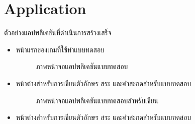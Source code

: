 \documentclass[12pt,oneside,openright,a4paper]{cpe-thai-project}
\begin{document}
\section{Application}
ตัวอย่างแอปพลิเคชันที่ดำเนินการสร้างเสร็จ
\begin{itemize}
  \item  หน้าแรกของเกมที่ใช้ทำแบบทดสอบ  
  \begin{figure}[!h]\centering
    \setlength{\fboxrule}{0.2mm} %
    \setlength{\fboxsep}{1cm}
    \caption{ภาพหน้าจอแอปพลิเคชันแบบทดสอบ}\label{fig:system}
  \end{figure}
    \item  หน้าต่างสำหรับการเขียนตัวอักษร สระ และคำสะกดสำหรับแบบทดสอบ
     \begin{figure}[!h]\centering
      \setlength{\fboxrule}{0.2mm} %
      \setlength{\fboxsep}{1cm}
      \caption{ภาพหน้าจอแอปพลิเคชันแบบทดสอบสำหรับเขียน}\label{fig:system}
    \end{figure}
  \newpage
 \item  หน้าต่างสำหรับการเขียนตัวอักษร สระ และคำสะกดสำหรับแบบทดสอบ
  \begin{figure}[!h]\centering
    \setlength{\fboxrule}{0.2mm} %
    \setlength{\fboxsep}{1cm}

\end{figure}
\end{itemize}
\end{document}
